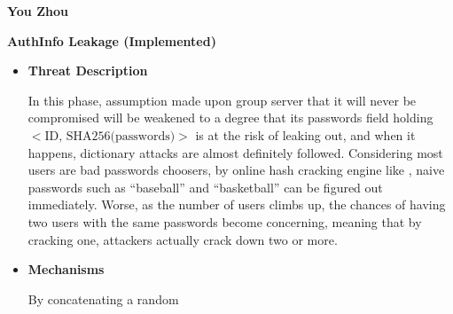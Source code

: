 \documentclass[letterpaper,11pt]{article}
\newcommand{\MYhref}[3][red]{\href{#2}{\color{#1}{#3}}}%
\newcommand{\resheading}[1]{{\large \colorbox{mygrey}{\begin{minipage}{\textwidth}{\textbf{#1 \vphantom{p\^{E}}}}\end{minipage}}}}
\begin{document}
{\LARGE\bf You Zhou}{$\,\,$\MYhref{mailto:kecen.zhou@gmail.com}{kecen.zhou@gmail.com}}
\vspace{0.2in}\\
\resheading{AuthInfo Leakage (Implemented)}
\vspace{0.1in}
\begin{itemize}[noitemsep,topsep=0pt,parsep=1pt,partopsep=1pt]
	\item\textbf{Threat Description}
	\begin{flushleft}
		In this phase, assumption made upon group server that it will never be compromised will be weakened to a degree that its passwords field holding $<\textrm{ID, SHA256(passwords)}>$ is at the risk of leaking out, and when it happens, dictionary attacks are almost definitely followed. Considering most users are bad passwords choosers, by online hash cracking engine like \MYhref{http://www.hashhunters.net/}{Hash Hunters}, naive passwords such as ``baseball'' and ``basketball'' can be figured out immediately. Worse, as the number of users climbs up, the chances of having two users with the same passwords become concerning, meaning that by cracking one, attackers actually crack down two or more. 
	\end{flushleft}
	\item\textbf{Mechanisms}
	\begin{flushleft}
		By concatenating a random 
	\end{flushleft}
\end{itemize}
\end{document}

